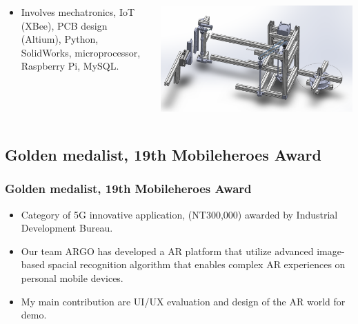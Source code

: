 \documentclass[compress, aspectratio=32]{beamer}
\begin{document}
\begin{frame}
    \begin{columns}
        \begin{column}{0.5\linewidth}
            \begin{itemize}
                \item Involves mechatronics, IoT (XBee), PCB design (Altium), Python, SolidWorks, microprocessor, Raspberry Pi, MySQL.
            \end{itemize}
        \end{column}
        \begin{column}{0.5\linewidth}
            \includegraphics[width=\linewidth]{pestMachine.png}
        \end{column}
    \end{columns}
\end{frame}

\subsection{Golden medalist, 19th Mobileheroes Award}
\begin{frame}
    \frametitle{Golden medalist, 19th Mobileheroes Award}
    \begin{itemize}
        \item Category of 5G innovative application, (NT300,000) awarded by Industrial Development Bureau.
        \item Our team ARGO has developed a AR platform that utilize advanced image-based spacial recognition algorithm that enables complex AR experiences on personal mobile devices.
        \item My main contribution are UI/UX evaluation and design of the AR world for demo.
    \end{itemize}
\end{frame}
\end{document}
